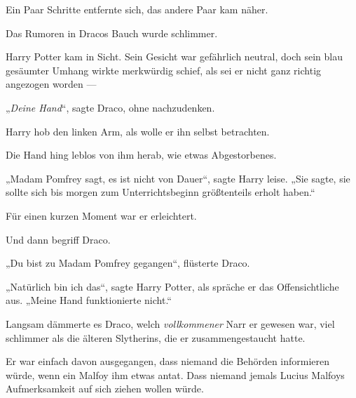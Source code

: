Ein Paar Schritte entfernte sich, das andere Paar kam näher.

Das Rumoren in Dracos Bauch wurde schlimmer.

Harry Potter kam in Sicht. Sein Gesicht war gefährlich neutral, doch sein blau gesäumter Umhang wirkte merkwürdig schief, als sei er nicht ganz richtig angezogen worden —

„\emph{Deine Hand}“, sagte Draco, ohne nachzudenken.

Harry hob den linken Arm, als wolle er ihn selbst betrachten.

Die Hand hing leblos von ihm herab, wie etwas Abgestorbenes.

„Madam Pomfrey sagt, es ist nicht von Dauer“, sagte Harry leise.
„Sie sagte, sie sollte sich bis morgen zum Unterrichtsbeginn größtenteils erholt haben.“

Für einen kurzen Moment war er erleichtert.

Und dann begriff Draco.

„Du bist zu Madam Pomfrey gegangen“, flüsterte Draco.

„Natürlich bin ich das“, sagte Harry Potter, als spräche er das Offensichtliche aus.
„Meine Hand funktionierte nicht.“

Langsam dämmerte es Draco, welch \emph{vollkommener} Narr er gewesen war, viel schlimmer als die älteren Slytherins, die er zusammengestaucht hatte.

Er war einfach davon ausgegangen, dass niemand die Behörden informieren würde, wenn ein Malfoy ihm etwas antat. Dass niemand jemals Lucius Malfoys Aufmerksamkeit auf sich ziehen wollen würde.

